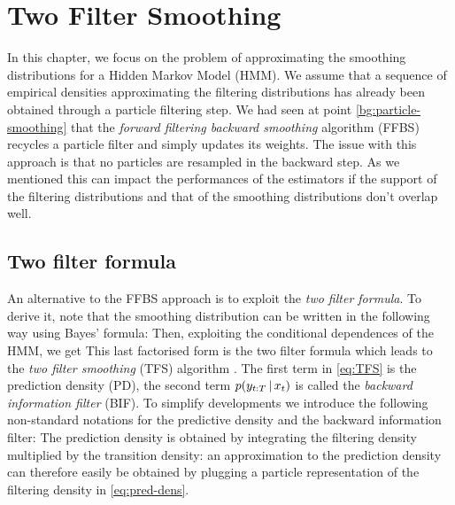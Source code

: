 
\section{Two Filter Smoothing}
In this chapter, we focus on the problem of approximating the smoothing distributions for a Hidden Markov Model (HMM). 
We assume that a sequence of empirical densities approximating the filtering distributions has already been obtained through a particle filtering step.
We had seen at point \ref{bg:particle-smoothing} that the \emph{forward filtering backward smoothing} algorithm (FFBS) recycles a particle filter and simply updates its weights. 
The issue with this approach is that no particles are resampled in the backward step. As we mentioned this can impact the performances of the estimators if the support of the filtering distributions and that of the smoothing distributions don't overlap well.

\subsection{Two filter formula}
An alternative to the FFBS approach is to exploit the \emph{two filter formula}. 
To derive it, note that the smoothing distribution can be written in the following way using Bayes' formula:
%
% 
Then, exploiting the conditional dependences of the HMM, we get
%
%
This last factorised form is the two filter formula which leads to the \emph{two filter smoothing} (TFS) algorithm \citep{bresler86, kitagawa96}. 
The first term in \eqref{eq:TFS} is the prediction density (PD), 
the second term $p(y_{t:T}\,|\, x_{t})$ is called the \emph{backward information filter} (BIF). To simplify developments we introduce the following non-standard notations for the predictive density and the backward information filter:
%
%
The prediction density is obtained by integrating the filtering density multiplied by the transition density:
%
%
an approximation to the prediction density can therefore easily be obtained by plugging a particle representation of the filtering density in \eqref{eq:pred-dens}. 
